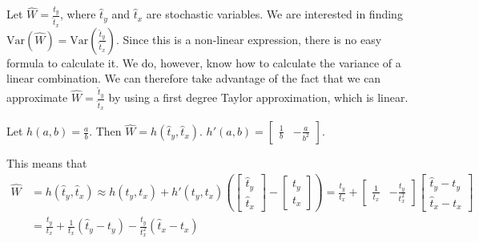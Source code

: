 \documentclass{article}
\begin{document}
\begin{example}
  Let \(\widehat{W} = \frac{\hat{t}_y}{\hat{t}_x}\), where \(\hat{t}_y\) and \(\hat{t}_x\) are stochastic variables. We
  are interested in finding \(\mathrm{Var} \left( \widehat{W} \right) = \mathrm{Var}
  \left( \frac{\hat{t}_y}{\hat{t}_x} \right)\).
  Since this is a non-linear expression, there is no easy formula to calculate
  it. We do, however, know how to calculate the variance of a linear
  combination. We can therefore take advantage of the fact that we can
  approximate \(\widehat{W} = \frac{\hat{t}_y}{\hat{t}_x}\) by using a first degree Taylor approximation,
  which is linear.

  Let \(h(a, b) = \frac{a}{b}\). Then \(\widehat{W} = h(\hat{t}_y, \hat{t}_x)\).
  \(h'(a, b) = \begin{bmatrix} \frac{1}{b} & -\frac{a}{b^2} \end{bmatrix}.\)

  This means that
  \begin{align*}
    \widehat{W} &= h(\hat{t}_y, \hat{t}_x)
    \approx h(t_y, t_x) + h'(t_y, t_x) \left( \begin{bmatrix} \hat{t}_y \\ \hat{t}_x \end{bmatrix}
    - \begin{bmatrix} t_y \\ t_x \end{bmatrix} \right)
    = \frac{t_y}{t_x} + \begin{bmatrix} \frac{1}{t_x} &
    -\frac{t_y}{t_x^2} \end{bmatrix} \begin{bmatrix} \hat{t}_y - t_y \\
      \hat{t}_x - t_x \end{bmatrix} \\
    &= \frac{t_y}{t_x} + \frac{1}{t_x} \left( \hat{t}_y - t_y \right) - \frac{t_y}{t_x^2} \left( \hat{t}_x - t_x \right)
    \end{align*}


\end{example}
\end{document}
